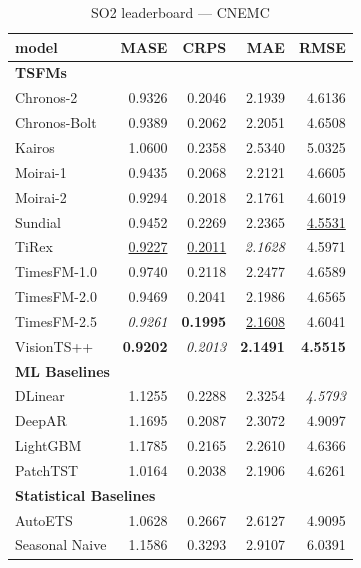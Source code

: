 \begin{table}[H]
\caption{SO2 leaderboard --- CNEMC}
\centering
\begin{small}
\begin{tabular}{lrrrr}
\toprule
model & MASE & CRPS & MAE & RMSE \\
\midrule
\multicolumn{5}{l}{\textbf{TSFMs}} \\
Chronos-2 & 0.9326 & 0.2046 & 2.1939 & 4.6136 \\
Chronos-Bolt & 0.9389 & 0.2062 & 2.2051 & 4.6508 \\
Kairos & 1.0600 & 0.2358 & 2.5340 & 5.0325 \\
Moirai-1 & 0.9435 & 0.2068 & 2.2121 & 4.6605 \\
Moirai-2 & 0.9294 & 0.2018 & 2.1761 & 4.6019 \\
Sundial & 0.9452 & 0.2269 & 2.2365 & \underline{4.5531} \\
TiRex & \underline{0.9227} & \underline{0.2011} & \textit{2.1628} & 4.5971 \\
TimesFM-1.0 & 0.9740 & 0.2118 & 2.2477 & 4.6589 \\
TimesFM-2.0 & 0.9469 & 0.2041 & 2.1986 & 4.6565 \\
TimesFM-2.5 & \textit{0.9261} & \textbf{0.1995} & \underline{2.1608} & 4.6041 \\
VisionTS++ & \textbf{0.9202} & \textit{0.2013} & \textbf{2.1491} & \textbf{4.5515} \\
\midrule
\multicolumn{5}{l}{\textbf{ML Baselines}} \\
DLinear & 1.1255 & 0.2288 & 2.3254 & \textit{4.5793} \\
DeepAR & 1.1695 & 0.2087 & 2.3072 & 4.9097 \\
LightGBM & 1.1785 & 0.2165 & 2.2610 & 4.6366 \\
PatchTST & 1.0164 & 0.2038 & 2.1906 & 4.6261 \\
\midrule
\multicolumn{5}{l}{\textbf{Statistical Baselines}} \\
AutoETS & 1.0628 & 0.2667 & 2.6127 & 4.9095 \\
Seasonal Naive & 1.1586 & 0.3293 & 2.9107 & 6.0391 \\
\bottomrule
\end{tabular}
\end{small}
\end{table}